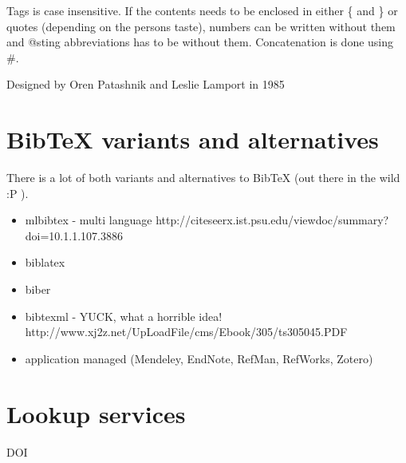 Tags is case insensitive. If the contents needs to be enclosed in
either \{ and \} or quotes (depending on the persons taste), numbers
can be written without them and @sting abbreviations has to be without
them. Concatenation is done using \#.\autocite{bibtex_resource}

Designed by Oren Patashnik and Leslie Lamport in 1985




\section{BibTeX variants and alternatives}
There is a lot of both variants and alternatives to BibTeX (out there in the wild :P ).

\begin{itemize}
\item mlbibtex - multi language http://citeseerx.ist.psu.edu/viewdoc/summary?doi=10.1.1.107.3886
\item biblatex
\item biber
\item bibtexml - YUCK, what a horrible idea! http://www.xj2z.net/UpLoadFile/cms/Ebook/305/ts305045.PDF
\item application managed (Mendeley, EndNote, RefMan, RefWorks, Zotero)
\end{itemize}

\section{Lookup services}
DOI

